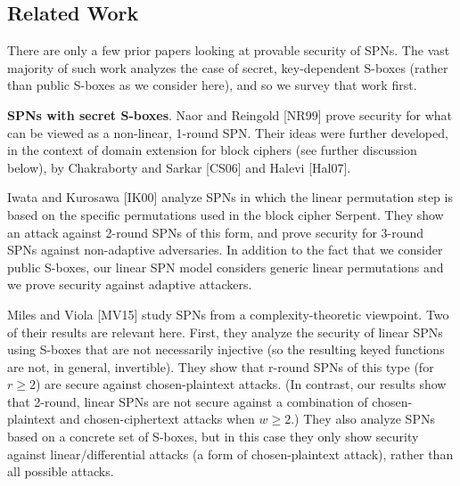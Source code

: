 %
%
%
%
%
%
%
%
%
%
%
%
%
%
%
%






\subsection{Related Work}


There are only a few prior papers looking at provable security of SPNs. The vast
majority of such work analyzes the case of secret, key-dependent S-boxes (rather
than public S-boxes as we consider here), and so we survey that work first.



{\bf SPNs with secret S-boxes}. Naor and Reingold [NR99] prove security for
what can be viewed as a non-linear, 1-round SPN. Their ideas were further
developed, in the context of domain extension for block ciphers (see further
discussion below), by Chakraborty and Sarkar [CS06] and Halevi [Hal07].


Iwata and Kurosawa [IK00] analyze SPNs in which the linear permutation
step is based on the specific permutations used in the block cipher Serpent. They
show an attack against 2-round SPNs of this form, and prove security for 3-round
SPNs against non-adaptive adversaries. In addition to the fact that we consider
public S-boxes, our linear SPN model considers generic linear permutations and
we prove security against adaptive attackers.

Miles and Viola [MV15] study SPNs from a complexity-theoretic viewpoint.
Two of their results are relevant here. First, they analyze the security of linear
SPNs using S-boxes that are not necessarily injective (so the resulting keyed
functions are not, in general, invertible). They show that r-round SPNs of this
type (for $r\geq 2$) are secure against chosen-plaintext attacks. (In contrast, our
results show that 2-round, linear SPNs are not secure against a combination of
chosen-plaintext and chosen-ciphertext attacks when $w\geq 2$.) They also analyze
SPNs based on a concrete set of S-boxes, but in this case they only show security
against linear/differential attacks (a form of chosen-plaintext attack), rather
than all possible attacks.


